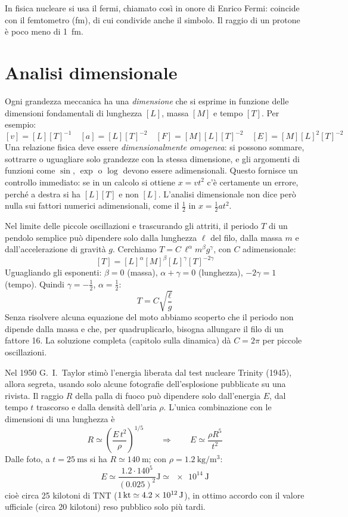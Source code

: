 In fisica nucleare si usa il fermi, chiamato così in onore di Enrico Fermi: coincide con il femtometro (\si{\femto\meter}), di cui condivide anche il simbolo. Il raggio di un protone è poco meno di \SI{1}{\femto\meter}.

\section{Analisi dimensionale}
Ogni grandezza meccanica ha una \emph{dimensione} che si esprime in funzione delle dimensioni fondamentali di lunghezza $[L]$, massa $[M]$ e tempo $[T]$. Per esempio:
\[ [v]=[L][T]^{-1}\quad [a]=[L][T]^{-2}\quad [F]=[M][L][T]^{-2}\quad [E]=[M][L]^2[T]^{-2}\]
Una relazione fisica deve essere \emph{dimensionalmente omogenea}: si possono sommare, sottrarre o uguagliare solo grandezze con la stessa dimensione, e gli argomenti di funzioni come $\sin$, $\exp$ o $\log$ devono essere adimensionali. Questo fornisce un controllo immediato: se in un calcolo si ottiene $x=v t^2$ c'è certamente un errore, perché a destra si ha $[L][T]$ e non $[L]$. L'analisi dimensionale non dice però nulla sui fattori numerici adimensionali, come il $\frac12$ in $x=\frac12 at^2$.

\begin{Es}
  Nel limite delle piccole oscillazioni e trascurando gli attriti, il periodo $T$ di un pendolo semplice può dipendere solo dalla lunghezza $\ell$ del filo, dalla massa $m$ e dall'accelerazione di gravità $g$. Cerchiamo $T=C\,\ell^\alpha m^\beta g^\gamma$, con $C$ adimensionale:
  \[ [T]=[L]^\alpha[M]^\beta[L]^\gamma[T]^{-2\gamma} \]
  Uguagliando gli esponenti: $\beta=0$ (massa), $\alpha+\gamma=0$ (lunghezza), $-2\gamma=1$ (tempo). Quindi $\gamma=-\frac12$, $\alpha=\frac12$:
  \[ T=C\sqrt{\frac{\ell}{g}} \]
  Senza risolvere alcuna equazione del moto abbiamo scoperto che il periodo non dipende dalla massa e che, per quadruplicarlo, bisogna allungare il filo di un fattore 16. La soluzione completa (capitolo sulla dinamica) dà $C=2\pi$ per piccole oscillazioni.
\end{Es}

\begin{Es}
  Nel 1950 G.~I.~Taylor stimò l'energia liberata dal test nucleare Trinity (1945), allora segreta, usando solo alcune fotografie dell'esplosione pubblicate su una rivista. Il raggio $R$ della palla di fuoco può dipendere solo dall'energia $E$, dal tempo $t$ trascorso e dalla densità dell'aria $\rho$. L'unica combinazione con le dimensioni di una lunghezza è
  \[ R\simeq\left(\frac{E\,t^2}{\rho}\right)^{1/5}\qquad\Rightarrow\qquad E\simeq\frac{\rho R^5}{t^2} \]
  Dalle foto, a $t=\SI{25}{\milli\second}$ si ha $R\simeq\SI{140}{\meter}$; con $\rho=\SI{1.2}{\kilogram\per\meter\cubed}$:
  \[ E\simeq\frac{1.2\cdot 140^5}{(0.025)^2}\si{\joule}\simeq\SI{e14}{\joule} \]
  cioè circa 25 kilotoni di TNT ($\SI{1}{kt}\simeq\SI{4.2E12}{\joule}$), in ottimo accordo con il valore ufficiale (circa 20 kilotoni) reso pubblico solo più tardi.
\end{Es}

